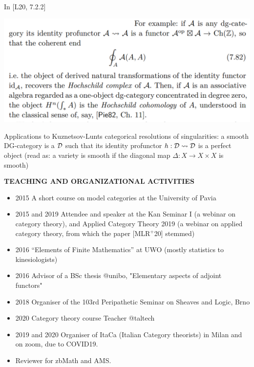 \documentclass{beamer}
\begin{document}
%
%
%
%
\begin{frame}
  In [\alert{L20}, 7.2.2]
  \begin{center}
  \includegraphics[width=.75\textwidth]{dg.png}
  \end{center}
  Applications to Kuznetsov-Lunts \alert{categorical resolutions of singularities}: a smooth DG-category is a $\cal D$ such that its identity profunctor $h : {\cal D} \rightsquigarrow \cal D$ is a perfect object (read as: a variety is smooth if the diagonal map $\Delta : X \to X\times X$ is smooth)
\end{frame}
%
%
%
%
%
\begin{frame}
  \Huge\centering \bfseries TEACHING AND ORGANIZATIONAL ACTIVITIES
\end{frame}
%
\begin{frame}\small
  \begin{itemize}
    \item<+-> 2015 A short course on \alert{model categories} at the University of Pavia
    \item<+-> 2015 and 2019 Attendee and speaker at the \alert{Kan Seminar I} (a webinar on category theory), and \alert{Applied Category Theory} 2019 (a webinar on applied category theory, from which the paper [\alert{MLR$^{+}$20}] stemmed)
    \item<+-> 2016 ``\alert{Elements of Finite Mathematics}'' at UWO (mostly statistics to kinesiologists)
    \item<+-> 2016 \alert{Advisor} of a BSc thesis @unibo, "Elementary aspects of adjoint functors" 
    \item<+-> 2018 \alert{Organiser} of the 103rd Peripathetic Seminar on Sheaves and Logic, Brno
    \item<+-> 2020 \alert{Category theory} course Teacher @taltech
    \item<+-> 2019 and 2020 \alert{Organiser} of ItaCa (\alert{Ita}lian \alert{Ca}tegory theorists) in Milan and on zoom, due to COVID19.
    \item<+-> Reviewer for zbMath and AMS.
  \end{itemize}
\end{frame}
\end{document}
